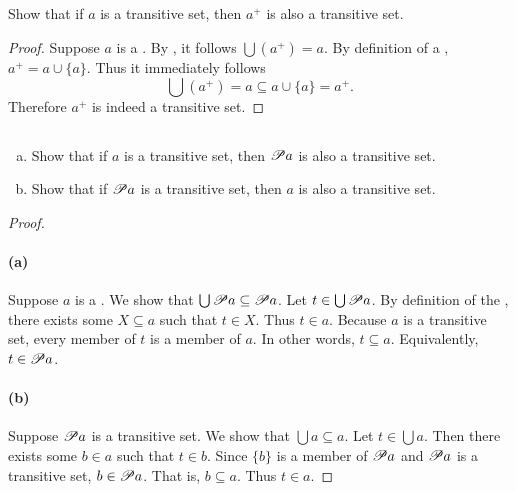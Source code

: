 \documentclass{report}
\begin{document}
\subsection{}%

Show that if $a$ is a transitive set, then $a^+$ is also a transitive set.

\begin{proof}

  Suppose $a$ is a .
  By , it follows $\bigcup \left(a^+\right) = a$.
  By definition of a , $a^+ = a \cup \{a\}$.
  Thus it immediately follows
    $$\bigcup \left(a^+\right) = a \subseteq a \cup \{a\} = a^+.$$
  Therefore $a^+$ is indeed a transitive set.

\end{proof}

\subsection{}%

\begin{enumerate}[(a)]
  \item Show that if $a$ is a transitive set, then $\mathscr{P}a$ is also a
    transitive set.
  \item Show that if $\mathscr{P}a$ is a transitive set, then $a$ is also a
    transitive set.
\end{enumerate}

\begin{proof}

  \paragraph{(a)}%

    Suppose $a$ is a .
    We show that $\bigcup \mathscr{P}a \subseteq \mathscr{P}a$.
    Let $t \in \bigcup \mathscr{P}a$.
    By definition of the , there exists some
      $X \subseteq a$ such that $t \in X$.
    Thus $t \in a$.
    Because $a$ is a transitive set, every member of $t$ is a member of $a$.
    In other words, $t \subseteq a$.
    Equivalently, $t \in \mathscr{P}a$.

  \paragraph{(b)}%

    Suppose $\mathscr{P}a$ is a transitive set.
    We show that $\bigcup a \subseteq a$.
    Let $t \in \bigcup a$.
    Then there exists some $b \in a$ such that $t \in b$.
    Since $\{b\}$ is a member of $\mathscr{P}a$ and $\mathscr{P}a$ is a
      transitive set, $b \in \mathscr{P}a$.
    That is, $b \subseteq a$.
    Thus $t \in a$.

\end{proof}
\end{document}
